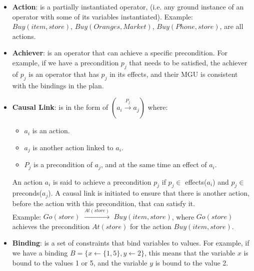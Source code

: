\begin{itemize}
  \item \label{def:action}
        \textbf{Action}:  is a partially instantiated operator,
        (i.e. any ground instance of an operator with some of its variables instantiated).
        Example: $Buy(item,store)$, $Buy(Oranges,Market)$, $Buy(Phone,store)$, are all actions.

  \item \label{def:achiever}
        \textbf{Achiever}: is an operator that can achieve a specific precondition. For example, if we have a precondition $p_j$ that needs to be satisfied, the achiever of $p_j$ is an operator that has $p_j$ in its effects, and their \ac{MGU} is consistent with the bindings in the plan.

  \item \label{def:causal_link}
        \textbf{Causal Link}: is in the form of $(a_i \xrightarrow{\text{$P_j$}} a_j)$ where:
        \begin{itemize}
          \item $a_i$ is an action.
          \item $a_j$ is another action linked to $a_i$.
          \item $P_j$ is a precondition of $a_j$, and at the same time an effect of $a_i$.
        \end{itemize}
        An action $a_i$ is said to achieve a precondition $p_j$ if $p_j \in$ effects($a_i$) and $p_j \in$ preconds($a_j$).
        A causal link is initiated to ensure that there is another action, before the action with this precondition, that can satisfy it.
        \\ Example: $Go(store)$ $\xrightarrow{\text{$At(store)$}}$ $Buy(item,store)$, where $Go(store)$ achieves the precondition $At(store)$ for the action $Buy(item,store)$.

  \item \label{def:binding_constraint}
        \textbf{Binding}: is a set of constraints that bind variables to values.
        For example, if we have a binding $B = \{x \leftarrow \{1,5\}, y \leftarrow 2\}$, this means that the variable $x$ is bound to the values 1 or 5,
        and the variable $y$ is bound to the value 2.


\end{itemize}

